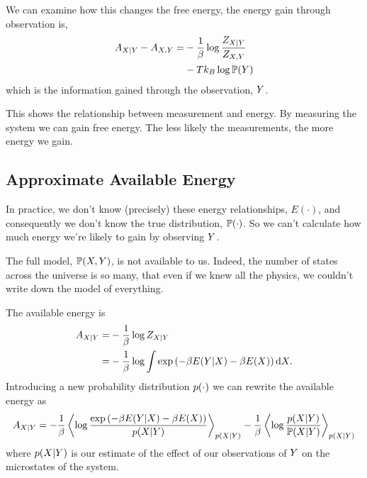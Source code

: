 \documentclass[]{article}
\begin{document}
We can examine how this changes the free energy, the energy gain through
observation is, 
\begin{align*}
A_{X|Y} - A_{X,Y} = & -\frac{1}{\beta} \log \frac{Z_{X|Y}}{Z_{X,Y}}\\
& -T k_B \log \mathbb{P}(Y)
\end{align*}
which is the information gained through the observation, \(Y\).

This shows the relationship between measurement and energy. By measuring
the system we can gain free energy. The less likely the measurements,
the more energy we gain.

\subsection{Approximate Available Energy}

In practice, we don't know (precisely) these energy relationships,
\(E(\cdot)\), and consequently we don't know the true distribution,
\(\mathbb{P}(\cdot)\). So we can't calculate how much energy we're likely
to gain by observing \(Y\).

The full model, \(\mathbb{P}(X, Y)\), is not
available to us. Indeed, the number of states across the universe is so
many, that even if we knew all the physics, we couldn't write down the
model of everything.

The available energy is 
\begin{align*}
A_{X|Y} = & -\frac{1}{\beta} \log Z_{X|Y} \\
= & -\frac{1}{\beta} \log \int \exp\left(-\beta E(Y|X) -\beta E(X)\right) \text{d}X.
\end{align*}
Introducing a new probability distribution \(p(\cdot)\) we
can rewrite the available energy as 
\[
A_{X|Y} =  -\frac{1}{\beta}\left\langle \log \frac{\exp\left(-\beta E(Y|X) -\beta E(X)\right)}{p(X|Y) } \right\rangle_{p(X|Y) } - \frac{1}{\beta}\left\langle \log \frac{p(X|Y)}{\mathbb{P}(X|Y) } \right\rangle_{p(X|Y) }
\] 
where \(p(X|Y)\) is our
estimate of the effect of our observations of \(Y\) on the
microstates of the system.
\end{document}
